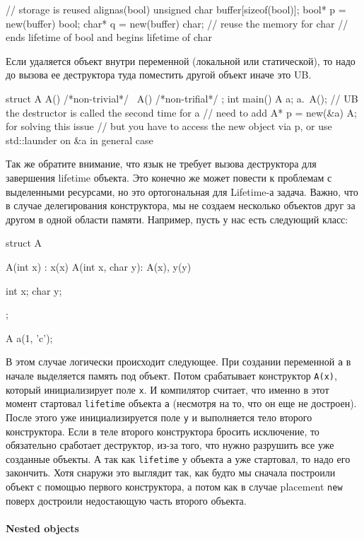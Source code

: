 \documentclass{article}
\begin{document}
\begin{enumerate}
\begin{cppcode}[\nonumbers]
// storage is reused
alignas(bool) unsigned char buffer[sizeof(bool)];
bool* p = new(buffer) bool;
char* q = new(buffer) char; // reuse the memory for char
                            // ends lifetime of bool and begins lifetime of char
\end{cppcode}
Если удаляется объект внутри переменной (локальной или статической), то надо до вызова ее деструктора туда поместить другой объект иначе это UB.
\begin{cppcode}[\nonumbers]
struct A {
  A() {/*non-trivial*/}
  ~A() {/*non-trifial*/}
};
int main() {
  A a;
  a.~A();
} // UB the destructor is called the second time for a
// need to add A* p = new(&a) A; for solving this issue
// but you have to access the new object via p, or use std::launder on &a in general case
\end{cppcode}
Так же обратите внимание, что язык не требует вызова деструктора для завершения lifetime объекта.
Это конечно же может повести к проблемам с выделенными ресурсами, но это ортогональная для Lifetime-а задача.
Важно, что в случае делегирования конструктора, мы не создаем несколько объектов друг за другом в одной области памяти.
Например, пусть у нас есть следующий класс:
\begin{cppcode}[\nonumbers]
struct A {
  A(int x) : x(x) {}
  A(int x, char y): A(x), y(y) {}
  
  int x;
  char y;
};

A a(1, 'c');
\end{cppcode}
В этом случае логически происходит следующее.
При создании переменной \verb"a" в начале выделяется память под объект.
Потом срабатывает конструктор \verb"A(x)", который инициализирует поле \verb"x".
И компилятор считает, что именно в этот момент стартовал \verb"lifetime" объекта \verb"a" (несмотря на то, что он еще не достроен).
После этого уже инициализируется поле \verb"y" и выполняется тело второго конструктора.
Если в теле второго конструктора бросить исключение, то обязательно сработает деструктор, из-за того, что нужно разрушить все уже созданные объекты.
А так как \verb"lifetime" у объекта \verb"a" уже стартовал, то надо его закончить.
Хотя снаружи это выглядит так, как будто мы сначала построили объект с помощью первого конструктора, а потом как в случае placement \verb"new" поверх достроили недостающую часть второго объекта.
\end{enumerate}

\paragraph{Nested objects}
\end{document}
